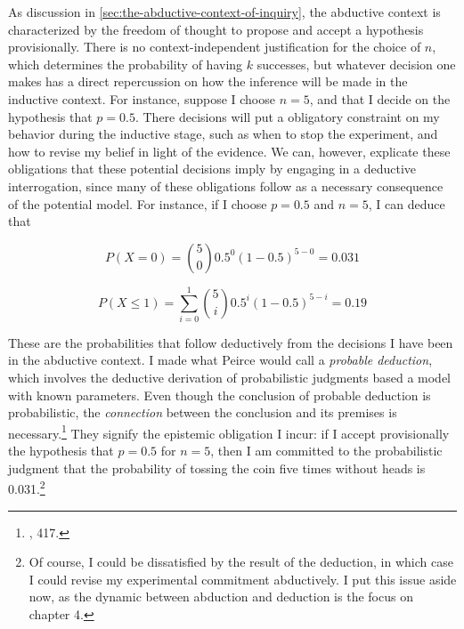 As discussion in \ref{sec:the-abductive-context-of-inquiry}, the abductive context is characterized by the freedom of thought to propose and accept a hypothesis provisionally. There is no context-independent justification for the
choice of \(n\), which determines the probability of having \(k\)
successes, but whatever decision one makes has a direct repercussion on how the inference will be made in the inductive context.  For instance, suppose I choose  \(n=5\), and that I decide on the hypothesis that \(p=0.5\). There decisions will put a obligatory constraint on my behavior during the inductive stage, such as when to stop the experiment, and how to revise my belief in light of the evidence. We can, however, explicate these  obligations that these potential decisions imply by engaging in a deductive interrogation, since many of these obligations follow as a necessary consequence of the potential model. For instance, if I choose \(p=0.5\) and \(n=5\), I can deduce that

\[P(X=0) = {5 \choose 0} 0.5^0 (1-0.5)^{5-0} = 0.031\]

\[P(X\leq 1) = \sum_{i=0}^1 {5 \choose i } 0.5^i (1-0.5)^{5-i} = 0.19\]

These are the probabilities that follow deductively from the decisions I
have been in the abductive context. I made what Peirce would call a
\emph{probable deduction}, which involves the deductive derivation of
probabilistic judgments based a model with known parameters. Even though
the conclusion of probable deduction is probabilistic, the
\emph{connection} between the conclusion and its premises is
necessary.\footnote{\cite{probableinference}, 417.}
They signify the epistemic obligation I incur: if I accept
provisionally the hypothesis that \(p=0.5\) for \(n=5\), then I am
committed to the probabilistic judgment that the probability of tossing
the coin five times without heads is 0.031.\footnote{Of course, I could
  be dissatisfied by the result of the deduction, in which case I could
  revise my experimental commitment abductively. I put this issue aside
  now, as the dynamic between abduction and deduction is the focus on
  chapter 4.}



